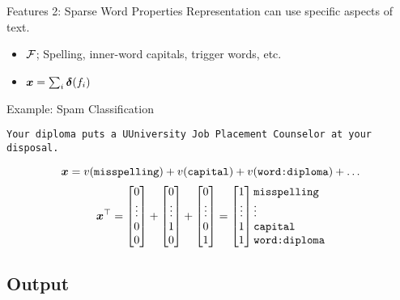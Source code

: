 \documentclass{beamer}
\begin{document}
\begin{frame}{Features 2: Sparse Word Properties}
  Representation can use specific aspects of text.
  \begin{itemize}
  \item $\mathcal{F}$; Spelling, inner-word capitals, trigger words, etc. 
  \item $\boldsymbol{x} = \sum_{i} \boldsymbol{\delta}(f_i)$ 
  \end{itemize}

  Example: Spam Classification

  \begin{center}
    \texttt{Your diploma puts a UUniversity Job Placement Counselor at
      your disposal.}
  \end{center}
  \[  \boldsymbol{x} = v(\texttt{misspelling}) + v(\texttt{capital}) + v(\texttt{word:diploma}) + \ldots\]
  \[
  \boldx^\top = 
 \begin{bmatrix} 0 \\ \vdots \\ 0\\  0 \\  \end{bmatrix} + 
 \begin{bmatrix} 0 \\ \vdots \\ 1\\ 0 \\  \end{bmatrix} +
 \begin{bmatrix} 0 \\ \vdots \\ 0\\  1 \\  \end{bmatrix} = 
 \begin{bmatrix} 1 \\ \vdots \\ 1 \\ 1 \\  \end{bmatrix}     \begin{matrix*}[l] \mathrm{\texttt{misspelling}} \\ \vdots \\ \mathrm{\texttt{capital}} \\ \mathrm{\texttt{word:diploma}} \\ \end{matrix*}
  \]
\end{frame}

\subsection{Output}
\end{document}
